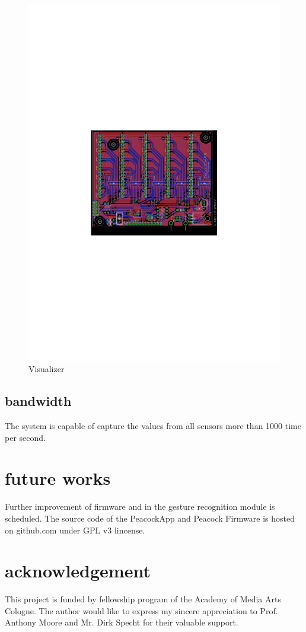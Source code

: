 \documentclass{nime-alternate}
\begin{document}
\begin{figure}[htbp]
       \centering
              \includegraphics[width=1\columnwidth]{board}
       \caption{Visualizer}
       \label{fig:modules}
\end{figure}

\subsection{bandwidth}
The system is capable of capture the values from all sensors more than 1000 time per second.



\section{future works}

Further improvement of firmware and in the gesture recognition module is scheduled.
The source code of the PeacockApp and Peacock Firmware is hosted on github.com under GPL v3 lincense.


\section{acknowledgement}
This project is funded by fellowship program of the Academy of Media Arts Cologne. The author would like to express my sincere appreciation to Prof. Anthony Moore and Mr. Dirk Specht for their valuable support.



\end{document}
